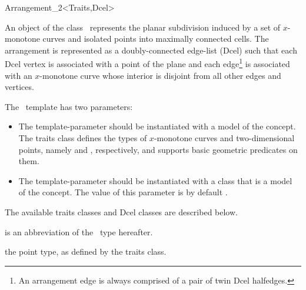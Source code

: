 
\ccRefPageBegin

\begin{ccRefClass}{Arrangement_2<Traits,Dcel>}
\label{arr_ref:arr}
    
\ccDefinition

An object  of the class \ccClassTemplateName\ represents the
planar subdivision induced by a set of $x$-monotone curves and isolated
points into maximally connected cells. The arrangement is represented as
a doubly-connected edge-list ({\sc Dcel}) such that each {\sc Dcel} vertex
is associated with a point of the plane and each edge\footnote{An arrangement
edge is always comprised of a pair of twin {\sc Dcel} halfedges.} is
associated with an $x$-monotone curve whose interior is disjoint from all
other edges and vertices.

The \ccClassTemplateName\ template has two parameters:
\begin{itemize}
\item The  template-parameter should be instantiated with
a model of the  concept. The traits
class defines the types of $x$-monotone curves and two-dimensional
points, namely  and ,
respectively, and supports basic geometric predicates on them.
\item The  template-parameter should be instantiated with
a class that is a model of the  concept. The
value of this parameter is by default
.
\end{itemize}
The available traits classes and {\sc Dcel} classes are described below. 

 is an abbreviation of the \ccRefName\ type hereafter.


\ccTypes

\ccGlue
{}

  {the point type, as defined by the traits class.}


\end{ccRefClass}
